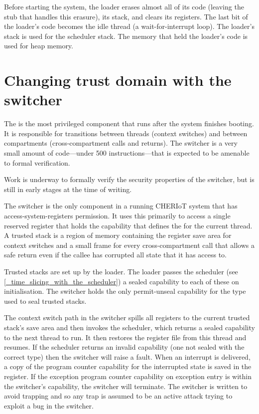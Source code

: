 Before starting the system, the loader erases almost all of its code (leaving the stub that handles this erasure), its stack, and clears its registers.
The last bit of the loader's code becomes the idle thread (a wait-for-interrupt loop).
The loader's stack is used for the scheduler stack.
The memory that held the loader's code is used for heap memory.

\section{Changing trust domain with the switcher}

The  is the most privileged component that runs after the system finishes booting.
It is responsible for transitions between threads (context switches) and between compartments (cross-compartment calls and returns).
The switcher is a very small amount of code—under 500 instructions—that is expected to be amenable to formal verification.

\begin{note}
Work is underway to formally verify the security properties of the switcher, but is still in early stages at the time of writing.
\end{note}

The switcher is the only component in a running CHERIoT system that has access-system-registers permission.
It uses this primarily to access a single reserved register that holds the capability that defines the  for the current thread.
A trusted stack is a region of memory containing the register save area for context switches and a small frame for every cross-compartment call that allows a safe return even if the callee has corrupted all state that it has access to.

Trusted stacks are set up by the loader.
The loader passes the scheduler (see \ref{_time_slicing_with_the_scheduler}) a sealed capability to each of these on initialisation.
The switcher holds the only permit-unseal capability for the type used to seal trusted stacks.

The context switch path in the switcher spills all registers to the current trusted stack's save area and then invokes the scheduler, which returns a sealed capability to the next thread to run.
It then restores the register file from this thread and resumes.
If the scheduler returns an invalid capability (one not sealed with the correct type) then the switcher will raise a fault.
When an interrupt is delivered, a copy of the program counter capability for the interrupted state is saved in the  register.
If the exception program counter capability on exception entry is within the switcher's capability, the switcher will terminate.
The switcher is written to avoid trapping and so any trap is assumed to be an active attack trying to exploit a bug in the switcher.

